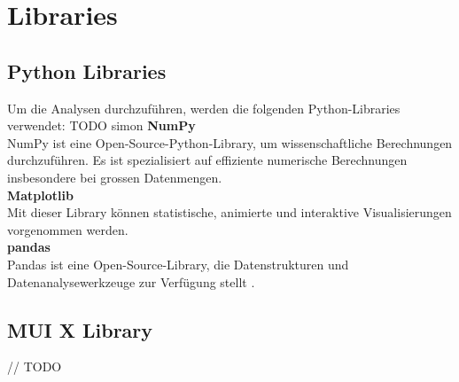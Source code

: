 

\chapter{Libraries} %

\label{AppendixA} %


\section{Python Libraries}
Um die Analysen durchzuführen, werden die folgenden Python-Libraries verwendet:
TODO simon
\textbf{NumPy}\\
NumPy ist eine Open-Source-Python-Library, um wissenschaftliche Berechnungen durchzuführen. Es ist spezialisiert auf effiziente numerische Berechnungen insbesondere bei grossen Datenmengen. \parencite{noauthor_numpy_nodate} \\
\textbf{Matplotlib}\\
Mit dieser Library können statistische, animierte und interaktive Visualisierungen vorgenommen werden. \parencite{noauthor_matplotlib_nodate} \\
\textbf{pandas}\\
Pandas ist eine Open-Source-Library, die Datenstrukturen und Datenanalysewerkzeuge zur Verfügung stellt \parencite{noauthor_pandas_nodate}.

\section{MUI X Library}
// TODO